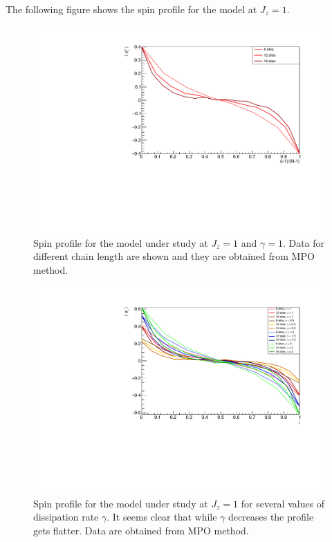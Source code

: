 The following figure shows the spin profile for the model at $J_z = 1$. 

\begin{figure}[H]
    \centering
    \includegraphics[scale=0.7]{Figures/NORM_LM_comparisonVSsize.pdf}
    \caption{Spin profile for the model under study at $J_z = 1$ and $\gamma=1$. Data for different chain length are shown and they are obtained from MPO method.}
    \label{fig:my_label}
\end{figure}

\begin{figure}[H]
    \centering
    \includegraphics[scale=0.7]{Figures/LMcomparisonVSsizeANDdissipationRate.pdf}
    \caption{Spin profile for the model under study at $J_z = 1$ for several values of dissipation rate $\gamma$. It seems clear that while $\gamma$ decreases the profile gets flatter. Data are obtained from MPO method.}
    \label{fig:LMcompVSsizeANDdissRate}
\end{figure}

